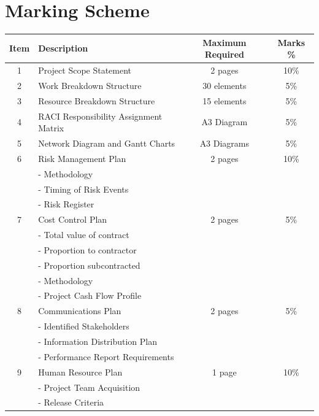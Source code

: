 \section*{Marking Scheme}
\begin{table}[ht]
	\centering
	\begin{tabular}{|c|l|c|c|}
		\hline
		\textbf{Item} & \textbf{Description} & \textbf{Maximum Required} & \textbf{Marks \%} \\
		\hline
		\hline

		1  & Project Scope Statement &  2 pages  & 10\% \\
		\hline

		2  & Work Breakdown Structure &  30 elements  & 5\% \\
		\hline

		3  & Resource Breakdown Structure &  15 elements  & 5\% \\
		\hline

		4  & RACI Responsibility Assignment Matrix &  A3 Diagram  & 5\% \\
		\hline

		5  & Network Diagram and Gantt Charts &  A3 Diagrams  & 5\% \\
		\hline

		6  & Risk Management Plan & 2 pages  & 10\% \\
   			&	- Methodology  & & \\
   			&	- Timing of Risk Events  & & \\
   			&	- Risk Register  & & \\
		\hline
		
		7  & Cost Control Plan &  2 pages  & 5\% \\
   			&	- Total value of contract  & & \\
   			&	- Proportion to contractor  & & \\
   			&	- Proportion subcontracted   & & \\
   			&	- Methodology  & & \\
   			&	- Project Cash Flow Profile  & & \\
		\hline

		8  & Communications Plan &  2 pages  & 5\% \\
   			&	- Identified Stakeholders  & & \\
   			&	- Information Distribution Plan  & & \\
   			&	- Performance Report Requirements  & & \\
		\hline

		9  & Human Resource Plan &  1 page  & 10\% \\
   			&	- Project Team Acquisition  & & \\
   			&	- Release Criteria  & & \\
		\hline


\end{tabular}
\end{table}
